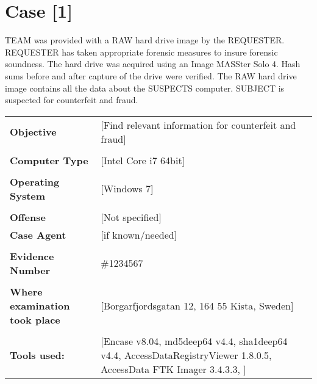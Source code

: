 \setlength\headsep{10pt}
\section{Case [1]}

TEAM was provided with a RAW hard drive image by the REQUESTER. 
REQUESTER has taken appropriate forensic measures to insure forensic soundness. The hard drive was acquired
using an Image MASSter Solo 4. Hash sums before and after capture of the drive were verified.
The RAW hard drive image contains all the data about the SUSPECTS computer.
SUBJECT is suspected for counterfeit and fraud.  


\begin{longtable}{p{}p{}}
\textbf{Objective} & [Find relevant information for counterfeit and fraud]\\
&\\
\textbf{Computer Type} & [Intel Core i7 64bit]\\
&\\
\textbf{Operating System} & [Windows 7]\\
&\\
\textbf{Offense} & [Not specified]\\
\textbf{Case Agent} & [if known/needed]\\
&\\
\textbf{Evidence Number} &  \#1234567\\
&\\
\textbf{Where examination took place} &  [Borgarfjordsgatan 12, 164 55 Kista, Sweden] \\
&\\
\textbf{Tools used:} & [Encase v8.04, md5deep64 v4.4, sha1deep64 v4.4, AccessDataRegistryViewer 1.8.0.5, AccessData FTK Imager 3.4.3.3, ]  
\end{longtable}

\newpage
